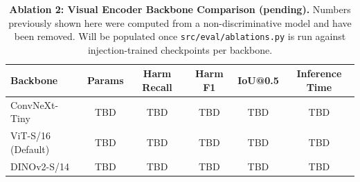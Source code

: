 \begin{table}[h]
\centering
\caption{\textbf{Ablation 2: Visual Encoder Backbone Comparison (pending).} Numbers previously shown here were computed from a non-discriminative model and have been removed. Will be populated once \texttt{src/eval/ablations.py} is run against injection-trained checkpoints per backbone.}
\label{tab:ablation_backbone}
\begin{tabular}{lccccc}
\toprule
\textbf{Backbone} & \textbf{Params} & \textbf{Harm Recall} & \textbf{Harm F1} & \textbf{IoU@0.5} & \textbf{Inference Time} \\
\midrule
ConvNeXt-Tiny & TBD & TBD & TBD & TBD & TBD \\
ViT-S/16 (Default) & TBD & TBD & TBD & TBD & TBD \\
DINOv2-S/14 & TBD & TBD & TBD & TBD & TBD \\
\bottomrule
\end{tabular}
\end{table}
